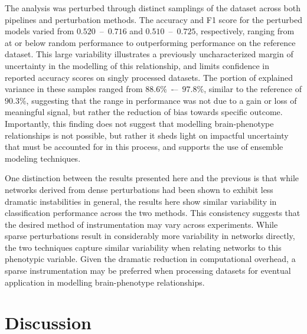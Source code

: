 \documentclass[fleqn,10pt]{SelfArx} %
\newcommand{\new}[1]{{#1}}
\begin{document}
The analysis was perturbed through distinct samplings of the dataset across both pipelines and perturbation methods.
The accuracy and F1 score for the perturbed models varied from $0.520$~–~$0.716$ and $0.510$~–~$0.725$, respectively,
ranging from at or below random performance to outperforming performance on the reference dataset. This large
variability illustrates a previously uncharacterized margin of uncertainty in the modelling of this relationship, and
limits confidence in reported accuracy scores on singly processed datasets. The portion of explained variance in these
samples ranged from $88.6\%$~-–~$97.8\%$, similar to the reference \new{of $90.3\%$}, suggesting that the range in
performance was not due to a gain or loss of meaningful signal, but rather the reduction of bias towards specific
outcome. Importantly, this finding does not suggest that modelling brain-phenotype relationships is not possible, but
rather it sheds light on impactful uncertainty that must be accounted for in this process, and supports the use of
ensemble modeling techniques.

\new{One distinction between the results presented here and the previous is that while networks derived from dense
perturbations had been shown to exhibit less dramatic instabilities in general, the results here show similar
variability in classification performance across the two methods. This consistency suggests that the desired method of
instrumentation may vary across experiments. While sparse perturbations result in considerably more
variability in networks directly, the two techniques capture similar variability when relating networks to this
phenotypic variable. Given the dramatic reduction in computational overhead, a sparse instrumentation may be preferred
when processing datasets for eventual application in modelling brain-phenotype relationships.}

\section*{Discussion}
\end{document}
